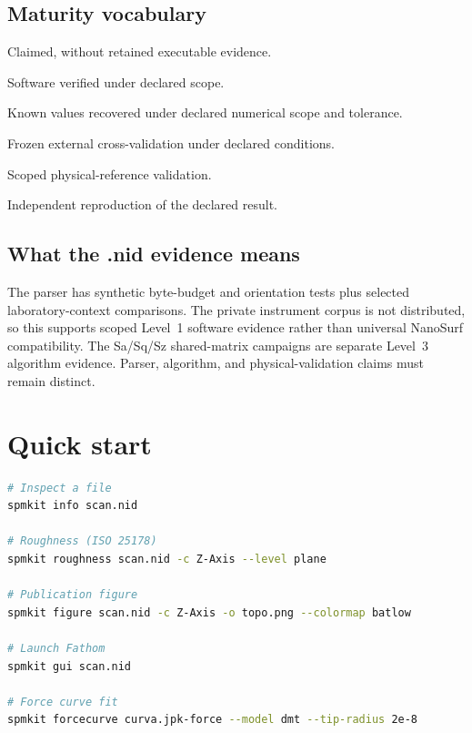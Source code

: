\documentclass[a4paper,11pt]{article}
\begin{document}
\subsection{Maturity vocabulary}
\begin{description}[nosep]
  \item[LEVEL 0] Claimed, without retained executable evidence.
  \item[LEVEL 1] Software verified under declared scope.
  \item[LEVEL 2] Known values recovered under declared numerical scope and tolerance.
  \item[LEVEL 3] Frozen external cross-validation under declared conditions.
  \item[LEVEL 4] Scoped physical-reference validation.
  \item[LEVEL 5] Independent reproduction of the declared result.
\end{description}

\subsection{What the .nid evidence means}
The parser has synthetic byte-budget and orientation tests plus selected laboratory-context
comparisons. The private instrument corpus is not distributed, so this supports scoped Level~1
software evidence rather than universal NanoSurf compatibility. The Sa/Sq/Sz shared-matrix
campaigns are separate Level~3 algorithm evidence. Parser, algorithm, and physical-validation
claims must remain distinct.

\section{Quick start}

\begin{lstlisting}[language=bash]
# Inspect a file
spmkit info scan.nid

# Roughness (ISO 25178)
spmkit roughness scan.nid -c Z-Axis --level plane

# Publication figure
spmkit figure scan.nid -c Z-Axis -o topo.png --colormap batlow

# Launch Fathom
spmkit gui scan.nid

# Force curve fit
spmkit forcecurve curva.jpk-force --model dmt --tip-radius 2e-8
\end{lstlisting}
\end{document}
